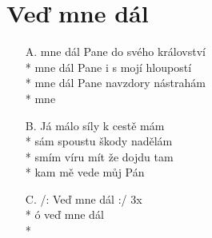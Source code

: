 \section{Veď mne dál}
\begin{enumerate}
\item[A.]  mne dál Pane do svého království \\*
 mne dál Pane i s mojí hloupostí \\*
 mne dál Pane navzdory nástrahám \\*
 mne  
\item[B.]Já málo síly k cestě mám \\*
sám spoustu škody nadělám \\*
smím víru mít že dojdu tam \\*
kam mě vede můj Pán 
\item[C.] /: Veď mne dál :/ 3x \\*
ó veď mne dál \\*
\end{enumerate}
